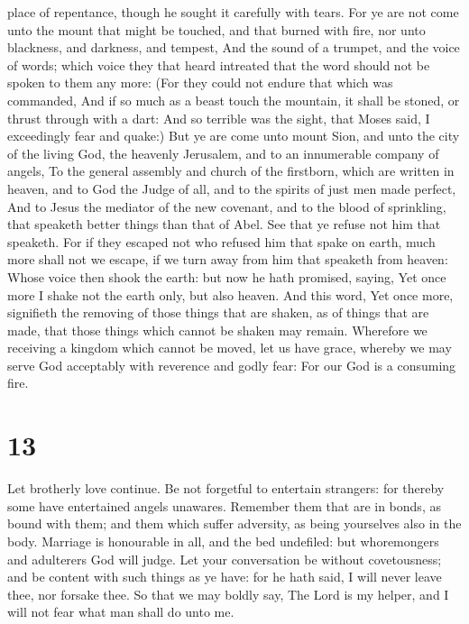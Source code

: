 place of repentance, though he sought it carefully with tears.
 For ye are not come unto the mount that might be touched,
and that burned with fire, nor unto blackness, and darkness, and
tempest,  And the sound of a trumpet, and the voice of
words; which voice they that heard intreated that the word should not be
spoken to them any more:  (For they could not endure that
which was commanded, And if so much as a beast touch the mountain, it
shall be stoned, or thrust through with a dart:  And so
terrible was the sight, that Moses said, I exceedingly fear and quake:)
 But ye are come unto mount Sion, and unto the city of the
living God, the heavenly Jerusalem, and to an innumerable company of
angels,  To the general assembly and church of the
firstborn, which are written in heaven, and to God the Judge of all, and
to the spirits of just men made perfect,  And to Jesus the
mediator of the new covenant, and to the blood of sprinkling, that
speaketh better things than that of Abel.  See that ye
refuse not him that speaketh. For if they escaped not who refused him
that spake on earth, much more shall not we escape, if we turn away from
him that speaketh from heaven:  Whose voice then shook the
earth: but now he hath promised, saying, Yet once more I shake not the
earth only, but also heaven.  And this word, Yet once more,
signifieth the removing of those things that are shaken, as of things
that are made, that those things which cannot be shaken may remain.
 Wherefore we receiving a kingdom which cannot be moved,
let us have grace, whereby we may serve God acceptably with reverence
and godly fear:  For our God is a consuming fire.

\hypertarget{section-12}{%
\section{13}\label{section-12}}

 Let brotherly love continue.  Be not forgetful
to entertain strangers: for thereby some have entertained angels
unawares.  Remember them that are in bonds, as bound with
them; and them which suffer adversity, as being yourselves also in the
body.  Marriage is honourable in all, and the bed undefiled:
but whoremongers and adulterers God will judge.  Let your
conversation be without covetousness; and be content with such things as
ye have: for he hath said, I will never leave thee, nor forsake thee.
 So that we may boldly say, The Lord is my helper, and I
will not fear what man shall do unto me.

